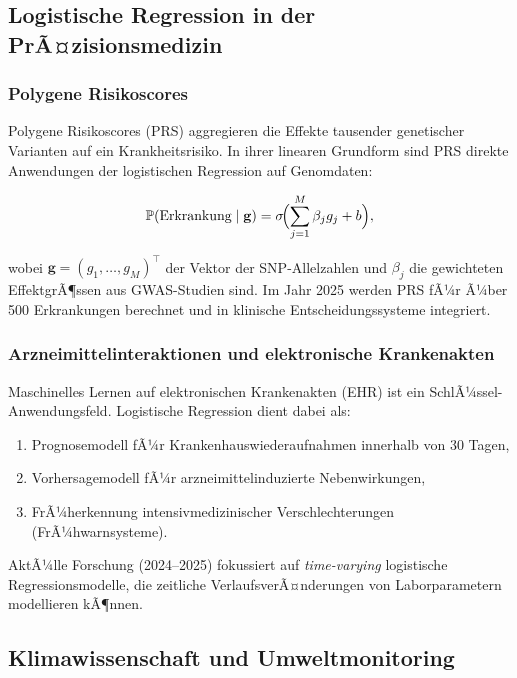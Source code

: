 ﻿\documentclass[12pt, a4paper]{article}
\theoremstyle{definition}
\theoremstyle{remark}
\newcommand{\Prob}{\mathbb{P}}
\newcommand{\sigmoid}{\sigma}
\newcommand{\T}{\top}
\begin{document}
\subsection{Logistische Regression in der PrÃ¤zisionsmedizin}

\subsubsection{Polygene Risikoscores}

Polygene Risikoscores (PRS) aggregieren die Effekte tausender genetischer Varianten auf ein
Krankheitsrisiko. In ihrer linearen Grundform sind PRS direkte Anwendungen der logistischen
Regression auf Genomdaten:

\begin{equation}
  \Prob(\text{Erkrankung} \mid \mathbf{g}) = \sigmoid\!\Bigl(\sum_{j=1}^M \beta_j g_j + b\Bigr),
\end{equation}

wobei $\mathbf{g} = (g_1,\ldots,g_M)^\T$ der Vektor der SNP-Allelzahlen und $\beta_j$ die
gewichteten EffektgrÃ¶ssen aus GWAS-Studien sind. Im Jahr 2025 werden PRS fÃ¼r Ã¼ber 500
Erkrankungen berechnet und in klinische Entscheidungssysteme integriert.

\subsubsection{Arzneimittelinteraktionen und elektronische Krankenakten}

Maschinelles Lernen auf elektronischen Krankenakten (EHR) ist ein SchlÃ¼ssel-Anwendungs\-feld.
Logistische Regression dient dabei als:
\begin{enumerate}[label=(\roman*)]
  \item Prognosemodell fÃ¼r Krankenhauswiederaufnahmen innerhalb von 30 Tagen,
  \item Vorhersagemodell fÃ¼r arzneimittelinduzierte Nebenwirkungen,
  \item FrÃ¼herkennung intensivmedizinischer Verschlechterungen (FrÃ¼hwarnsysteme).
\end{enumerate}

AktÃ¼lle Forschung (2024--2025) fokussiert auf \emph{time-varying} logistische Regressionsmodelle,
die zeitliche VerlaufsverÃ¤nderungen von Laborparametern modellieren kÃ¶nnen.

\subsection{Klimawissenschaft und Umweltmonitoring}
\end{document}
